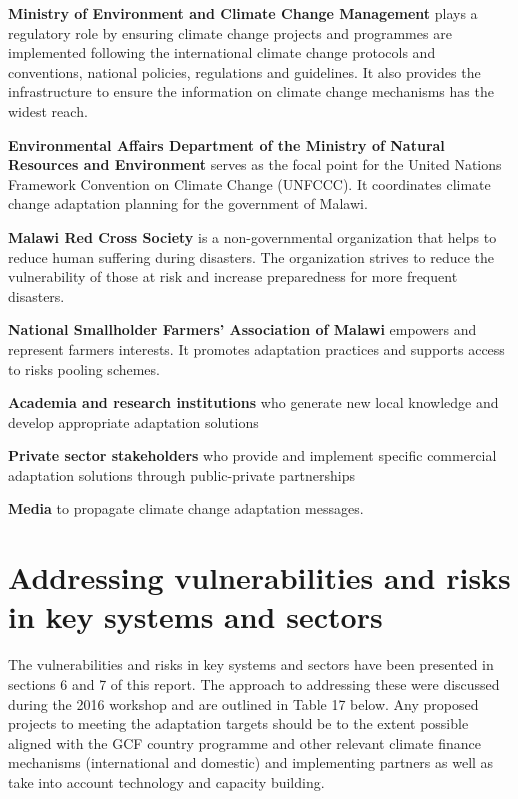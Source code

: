 \documentclass[
]{book}
\begin{document}
\textbf{Ministry of Environment and Climate Change Management} plays a regulatory role by ensuring climate change projects and programmes are implemented following the international climate change protocols and conventions, national policies, regulations and guidelines. It also provides the infrastructure to ensure the information on climate change mechanisms has the widest reach.

\textbf{Environmental Affairs Department of the Ministry of Natural Resources and Environment} serves as the focal point for the United Nations Framework Convention on Climate Change (UNFCCC). It coordinates climate change adaptation planning for the government of Malawi.

\textbf{Malawi Red Cross Society} is a non-governmental organization that helps to reduce human suffering during disasters. The organization strives to reduce the vulnerability of those at risk and increase preparedness for more frequent disasters.

\textbf{National Smallholder Farmers' Association of Malawi} empowers and represent farmers interests. It promotes adaptation practices and supports access to risks pooling schemes.

\textbf{Academia and research institutions} who generate new local knowledge and develop appropriate adaptation solutions

\textbf{Private sector stakeholders} who provide and implement specific commercial adaptation solutions through public-private partnerships

\textbf{Media} to propagate climate change adaptation messages.

\hypertarget{addressing-vulnerabilities-and-risks-in-key-systems-and-sectors}{%
\section{Addressing vulnerabilities and risks in key systems and sectors}\label{addressing-vulnerabilities-and-risks-in-key-systems-and-sectors}}

The vulnerabilities and risks in key systems and sectors have been presented in sections 6 and 7 of this report. The approach to addressing these were discussed during the 2016 workshop and are outlined in Table 17 below. Any proposed projects to meeting the adaptation targets should be to the extent possible aligned with the GCF country programme and other relevant climate finance mechanisms (international and domestic) and implementing partners as well as take into account technology and capacity building.
\end{document}
